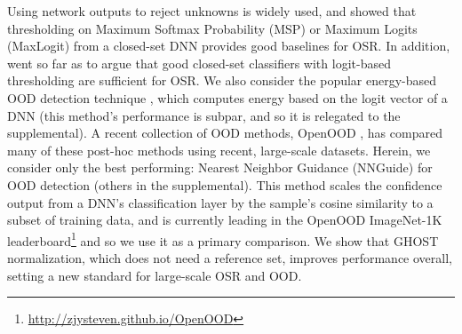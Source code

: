 Using network outputs to reject unknowns is widely used, and \citet{hendrycks17baseline,hendrycks2022scaling} showed that thresholding on Maximum  Softmax Probability (MSP) or Maximum Logits (MaxLogit) from a closed-set DNN provides good baselines for OSR. 
In addition, \citet{vaze2022openset} went so far as to argue that good closed-set classifiers with logit-based thresholding are sufficient for OSR. 
We also consider the popular energy-based OOD detection technique \cite{liu2020energy}, which computes energy based on the logit vector of a DNN (this method's performance is subpar, and so it is relegated to the supplemental). 
A recent collection of OOD methods, OpenOOD \cite{yang2022openood,zhang2023openood}, has compared many of these post-hoc methods using recent, large-scale datasets.
Herein, we consider only the best performing: Nearest Neighbor Guidance (NNGuide) \cite{park2023nearest} for OOD detection (others in the supplemental).
This method scales the confidence output from a DNN's classification layer by the sample's cosine similarity to a subset of training data, and is currently leading in the OpenOOD ImageNet-1K leaderboard\footnote{\url{http://zjysteven.github.io/OpenOOD}} and so we use it as a primary comparison.
We show that GHOST normalization, which does not need a reference set, improves performance overall, setting a new standard for large-scale OSR and OOD.